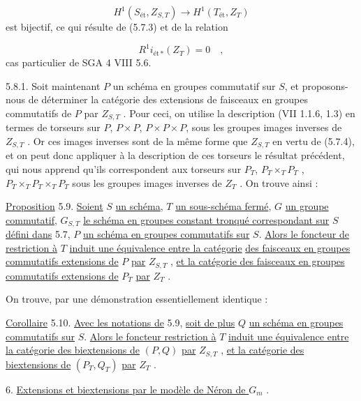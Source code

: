 \begin{equation*}
H^1(S_{\text{ét}}, Z_{S,T}) \longrightarrow H^1(T_{\text{ét}}, Z_T)
\end{equation*}
est bijectif, ce qui résulte de (5.7.3) et de la relation

\begin{equation*}
R^1 i_{\text{ét}\,*}(Z_T) = 0 \quad ,
\end{equation*}
cas particulier de SGA 4 VIII 5.6.

5.8.1. Soit maintenant $P$ un schéma en groupes commutatif sur $S$, et proposons-nous de déterminer la catégorie des extensions de faisceaux en groupes commutatifs de $P$ par $Z_{S,T}$ . Pour ceci, on utilise la description (VII 1.1.6, 1.3) en termes de torseurs sur $P$, $P \times P$, $P \times P \times P$, sous les groupes images inverses de $Z_{S,T}$ . Or ces images inverses sont de la même forme que $Z_{S,T}$ en vertu de (5.7.4), et on peut donc appliquer à la description de ces torseurs le résultat précédent, qui nous apprend qu'ils correspondent aux torseurs sur $P_T$, $P_T \times_T P_T$ , $P_T \times_T P_T \times_T P_T$ sous les groupes images inverses de $Z_T$ . On trouve ainsi :

\underline{Proposition} 5.9. \underline{Soient} $S$ \underline{un schéma}, $T$ \underline{un sous-schéma fermé}, $G$ \underline{un groupe commutatif}, $G_{S,T}$ \underline{le schéma en groupes constant tronqué correspondant sur} $S$ \underline{défini dans} 5.7, $P$ \underline{un schéma en groupes commutatifs sur} $S$. \underline{Alors le foncteur de restriction à} $T$ \underline{induit une équivalence entre la catégorie}
\underline{des faisceaux en groupes commutatifs extensions de} $P$ \underline{par} $Z_{S,T}$ , \underline{et la catégorie des faisceaux en groupes commutatifs extensions de} $P_T$ \underline{par} $Z_T$ .

On trouve, par une démonstration essentiellement identique :

\underline{Corollaire} 5.10. \underline{Avec les notations de} 5.9, \underline{soit de plus} $Q$ \underline{un schéma en groupes commutatifs sur} $S$. \underline{Alors le foncteur restriction à} $T$ \underline{induit une équivalence entre la catégorie des biextensions de} $(P,Q)$ \underline{par} $Z_{S,T}$ , \underline{et la catégorie des biextensions de} $(P_T,Q_T)$ \underline{par} $Z_T$ .

6. \underline{Extensions et biextensions par le modèle de Néron de $G_m$} .

